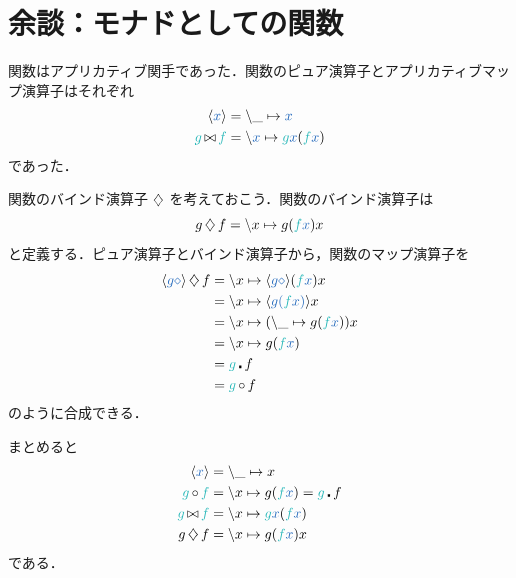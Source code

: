 \documentclass[a5paper,twoside,fleqn,draft]{jsbook}
\begin{document}
\section{余談：モナドとしての関数}

関数はアプリカティブ関手であった．関数のピュア演算子とアプリカティブマップ演算子はそれぞれ
\begin{align}
\mConstWith{x}&=\hLambdaSyntax{\_}{\hVar{x}}\\
\hFunc{g}\mAppMapFunc\hFunc{f}&=\hLambdaSyntax{\hVar{x}}{\hFunc{g}\hVar{x}(\hFunc{f}\hVar{x})}
\end{align}
であった．

関数のバインド演算子 $\operatorname{\diamondsuit}$ を考えておこう．関数のバインド演算子は
\begin{equation}
g\mBindFunc f=\hLambdaSyntax{x}{g(\hFunc{f}\hVar{x})x}
\end{equation}
と定義する．ピュア演算子とバインド演算子から，関数のマップ演算子を
\begin{align}
\mConstWith{g\hAnonParam}\mBindFunc f
&=\hLambdaSyntax{x}{\mConstWith{g\hAnonParam}(\hFunc{f}\hVar{x})x}\\
&=\hLambdaSyntax{x}{\mConstWith{g(\hFunc{f}\hVar{x})}x}\\
&=\hLambdaSyntax{x}{(\hLambdaSyntax{\_}{g(\hFunc{f}\hVar{x})})x}\\
&=\hLambdaSyntax{x}{g(\hFunc{f}\hVar{x})}\\
&=\hFunc{g}\hCompose f\\
&=\hFunc{g}\mMapFunc f
\end{align}
のように合成できる．

まとめると
\begin{align}
\mConstWith{x}&=\hLambdaSyntax{\_}{x}\\
\hFunc{g}\mMapFunc\hFunc{f}&=\hLambdaSyntax{x}{g(\hFunc{f}\hVar{x})}=\hFunc{g}\hCompose f\\
\hFunc{g}\mAppMapFunc\hFunc{f}&=\hLambdaSyntax{x}{\hFunc{g}\hVar{x}(\hFunc{f}\hVar{x})}\\
g\mBindFunc f&=\hLambdaSyntax{x}{g(\hFunc{f}\hVar{x})x}
\end{align}
である．

\end{document}
